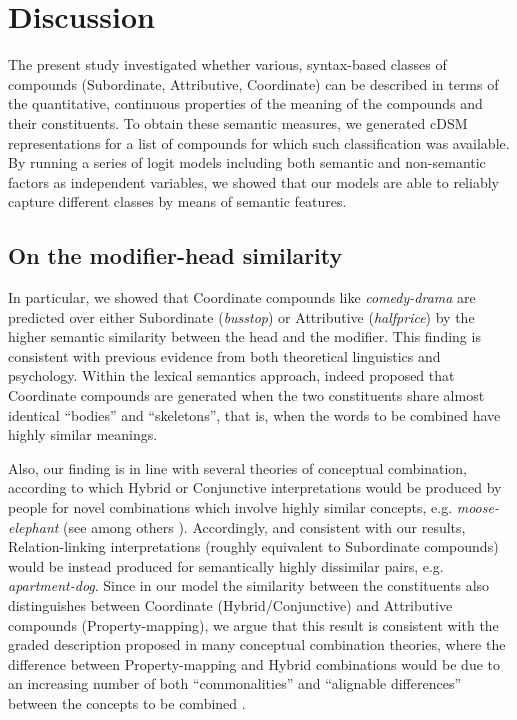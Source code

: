 \documentclass[output=paper]{langsci/langscibook}
\begin{document}
\section{Discussion}
\label{sec:pez:discussion}

The present study investigated whether various, syntax-based classes of compounds (Subordinate, Attributive, Coordinate) can be described in terms of the quantitative, continuous properties of the meaning of the compounds and their constituents. To obtain these semantic measures, we generated cDSM representations for a list of compounds for which such classification was available. By running a series of logit models including both semantic and non-semantic factors as independent variables, we showed that our models are able to reliably capture different classes by means of semantic features.

\subsection{On the modifier-head similarity}

In particular, we showed that Coordinate compounds like \emph{comedy-drama} are predicted over either Subordinate (\emph{busstop}) or Attributive (\emph{halfprice}) by the higher semantic similarity between the head and the modifier. This finding is consistent with previous evidence from both theoretical linguistics and psychology. Within the lexical semantics approach, \cite{lieber5OHC} indeed proposed that Coordinate compounds are generated when the two constituents share almost identical ``bodies'' and ``skeletons'', that is, when the words to be combined have highly similar meanings.

Also, our finding is in line with several theories of conceptual combination, according to which Hybrid or Conjunctive interpretations would be produced by people for novel combinations which involve highly similar concepts, e.g. \emph{moose-elephant} (see among others \citealt{wisniewski1996}). Accordingly, and consistent with our results, Relation-linking interpretations (roughly equivalent to Subordinate compounds) would be instead produced for semantically highly dissimilar pairs, e.g. \emph{apartment-dog}. Since in our model the similarity between the constituents also distinguishes between Coordinate (Hybrid/Conjunctive) and Attributive compounds (Property-mapping), we argue that this result is consistent with the graded description proposed in many conceptual combination theories, where the difference between Property-mapping and Hybrid combinations would be due to an increasing number of both ``commonalities'' and ``alignable differences'' between the concepts to be combined \citep{wisniewski1996}.
\end{document}

